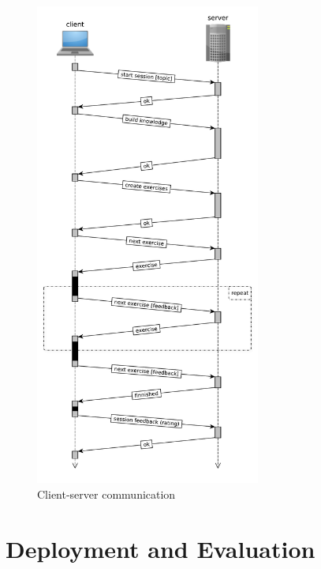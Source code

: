 \documentclass[12pt, twoside]{fithesis2}
\renewcommand{\_}{\leavevmode \kern0.07em\vbox{\hrule width0.4em}}
\begin{document}

\begin{figure}[h]
  \centering
  \includegraphics[width=0.66\textwidth]{images/client-server-communication.pdf}
  \caption{Client-server communication}
  \label{fig:client-server-communication}
\end{figure}


\chapter{Deployment and Evaluation}
\label{chap:evaluation}
\end{document}
